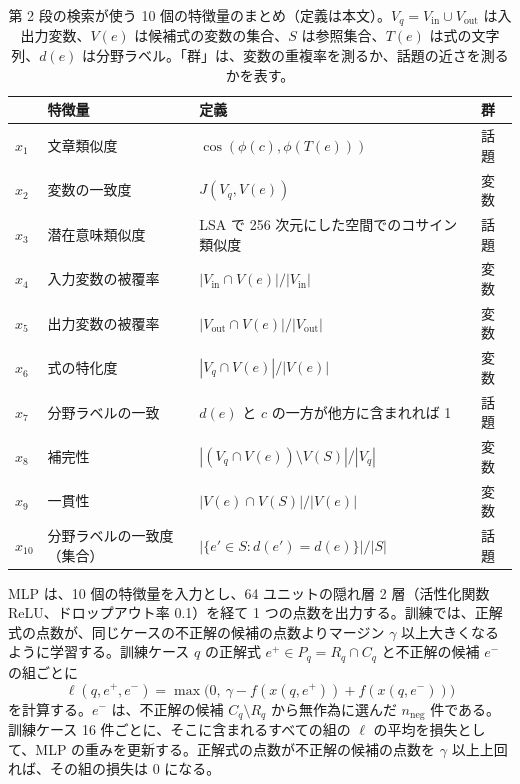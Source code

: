 \documentclass[a4j,dvipdfmx,11pt]{jresume}
\newcommand{\Vin}{V_{\mathrm{in}}}
\newcommand{\Vout}{V_{\mathrm{out}}}
\begin{document}
\begin{table}[t]\centering
\footnotesize
\caption{第 2 段の検索が使う 10 個の特徴量のまとめ（定義は本文）。$V_q = \Vin \cup \Vout$ は入出力変数、$V(e)$ は候補式の変数の集合、$S$ は参照集合、$T(e)$ は式の文字列、$d(e)$ は分野ラベル。「群」は、変数の重複率を測るか、話題の近さを測るかを表す。}
\label{tab:features}
\begin{tabular}{@{}llll@{}}
\toprule
 & 特徴量 & 定義 & 群 \\
\midrule
$x_1$ & 文章類似度 & $\cos(\phi(c), \phi(T(e)))$ & 話題 \\
$x_2$ & 変数の一致度 & $J(V_q, V(e))$ & 変数 \\
$x_3$ & 潜在意味類似度 & LSA で 256 次元にした空間でのコサイン類似度 & 話題 \\
$x_4$ & 入力変数の被覆率 & $|\Vin \cap V(e)| / |\Vin|$ & 変数 \\
$x_5$ & 出力変数の被覆率 & $|\Vout \cap V(e)| / |\Vout|$ & 変数 \\
$x_6$ & 式の特化度 & $|V_q \cap V(e)| / |V(e)|$ & 変数 \\
$x_7$ & 分野ラベルの一致 & $d(e)$ と $c$ の一方が他方に含まれれば 1 & 話題 \\
\midrule
$x_8$ & 補完性 & $|(V_q \cap V(e)) \setminus V(S)| / |V_q|$ & 変数 \\
$x_9$ & 一貫性 & $|V(e) \cap V(S)| / |V(e)|$ & 変数 \\
$x_{10}$ & 分野ラベルの一致度（集合） & $|\{e' \in S : d(e') = d(e)\}| / |S|$ & 話題 \\
\bottomrule
\end{tabular}
\end{table}

MLP は、10 個の特徴量を入力とし、64 ユニットの隠れ層 2 層（活性化関数 ReLU、ドロップアウト率 0.1）を経て 1 つの点数を出力する。訓練では、正解式の点数が、同じケースの不正解の候補の点数よりマージン $\gamma$ 以上大きくなるように学習する。訓練ケース $q$ の正解式 $e^+ \in P_q = R_q \cap C_q$ と不正解の候補 $e^-$ の組ごとに
\begin{equation}
  \ell(q, e^+, e^-) = \max\bigl(0,\ \gamma - f(x(q, e^+)) + f(x(q, e^-))\bigr)
  \label{eq:loss}
\end{equation}
を計算する。$e^-$ は、不正解の候補 $C_q \setminus R_q$ から無作為に選んだ $n_{\mathrm{neg}}$ 件である。訓練ケース 16 件ごとに、そこに含まれるすべての組の $\ell$ の平均を損失として、MLP の重みを更新する。正解式の点数が不正解の候補の点数を $\gamma$ 以上上回れば、その組の損失は 0 になる。
\end{document}
